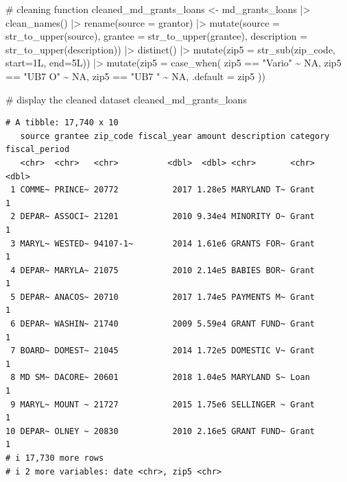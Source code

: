 \documentclass[
  letterpaper,
  DIV=11,
  numbers=noendperiod]{scrreprt}
\newenvironment{Shaded}{\begin{snugshade}}{\end{snugshade}}
\newcommand{\AttributeTok}[1]{\textcolor[rgb]{0.40,0.45,0.13}{#1}}
\newcommand{\CommentTok}[1]{\textcolor[rgb]{0.37,0.37,0.37}{#1}}
\newcommand{\ConstantTok}[1]{\textcolor[rgb]{0.56,0.35,0.01}{#1}}
\newcommand{\FunctionTok}[1]{\textcolor[rgb]{0.28,0.35,0.67}{#1}}
\newcommand{\NormalTok}[1]{\textcolor[rgb]{0.00,0.23,0.31}{#1}}
\newcommand{\OtherTok}[1]{\textcolor[rgb]{0.00,0.23,0.31}{#1}}
\newcommand{\SpecialCharTok}[1]{\textcolor[rgb]{0.37,0.37,0.37}{#1}}
\newcommand{\StringTok}[1]{\textcolor[rgb]{0.13,0.47,0.30}{#1}}
\begin{document}
\begin{Shaded}
\begin{Highlighting}[]
\CommentTok{\# cleaning function}
\NormalTok{cleaned\_md\_grants\_loans }\OtherTok{\textless{}{-}}\NormalTok{ md\_grants\_loans }\SpecialCharTok{|\textgreater{}}
  \FunctionTok{clean\_names}\NormalTok{() }\SpecialCharTok{|\textgreater{}} 
  \FunctionTok{rename}\NormalTok{(}\AttributeTok{source =}\NormalTok{ grantor) }\SpecialCharTok{|\textgreater{}} 
  \FunctionTok{mutate}\NormalTok{(}\AttributeTok{source =} \FunctionTok{str\_to\_upper}\NormalTok{(source), }\AttributeTok{grantee =} \FunctionTok{str\_to\_upper}\NormalTok{(grantee), }\AttributeTok{description =} \FunctionTok{str\_to\_upper}\NormalTok{(description)) }\SpecialCharTok{|\textgreater{}} 
  \FunctionTok{distinct}\NormalTok{() }\SpecialCharTok{|\textgreater{}}
  \FunctionTok{mutate}\NormalTok{(}\AttributeTok{zip5 =} \FunctionTok{str\_sub}\NormalTok{(zip\_code, }\AttributeTok{start=}\NormalTok{1L, }\AttributeTok{end=}\NormalTok{5L)) }\SpecialCharTok{|\textgreater{}}
  \FunctionTok{mutate}\NormalTok{(}\AttributeTok{zip5 =} \FunctionTok{case\_when}\NormalTok{(}
\NormalTok{    zip5 }\SpecialCharTok{==} \StringTok{"Vario"} \SpecialCharTok{\textasciitilde{}} \ConstantTok{NA}\NormalTok{,}
\NormalTok{    zip5 }\SpecialCharTok{==} \StringTok{"UB7 O"} \SpecialCharTok{\textasciitilde{}} \ConstantTok{NA}\NormalTok{,}
\NormalTok{    zip5 }\SpecialCharTok{==} \StringTok{"UB7 "} \SpecialCharTok{\textasciitilde{}} \ConstantTok{NA}\NormalTok{,}
    \AttributeTok{.default =}\NormalTok{ zip5}
\NormalTok{  ))}

\CommentTok{\# display the cleaned dataset}
\NormalTok{cleaned\_md\_grants\_loans}
\end{Highlighting}
\end{Shaded}

\begin{verbatim}
# A tibble: 17,740 x 10
   source grantee zip_code fiscal_year amount description category fiscal_period
   <chr>  <chr>   <chr>          <dbl>  <dbl> <chr>       <chr>            <dbl>
 1 COMME~ PRINCE~ 20772           2017 1.28e5 MARYLAND T~ Grant                1
 2 DEPAR~ ASSOCI~ 21201           2010 9.34e4 MINORITY O~ Grant                1
 3 MARYL~ WESTED~ 94107-1~        2014 1.61e6 GRANTS FOR~ Grant                1
 4 DEPAR~ MARYLA~ 21075           2010 2.14e5 BABIES BOR~ Grant                1
 5 DEPAR~ ANACOS~ 20710           2017 1.74e5 PAYMENTS M~ Grant                1
 6 DEPAR~ WASHIN~ 21740           2009 5.59e4 GRANT FUND~ Grant                1
 7 BOARD~ DOMEST~ 21045           2014 1.72e5 DOMESTIC V~ Grant                1
 8 MD SM~ DACORE~ 20601           2018 1.04e5 MARYLAND S~ Loan                 1
 9 MARYL~ MOUNT ~ 21727           2015 1.75e6 SELLINGER ~ Grant                1
10 DEPAR~ OLNEY ~ 20830           2010 2.16e5 GRANT FUND~ Grant                1
# i 17,730 more rows
# i 2 more variables: date <chr>, zip5 <chr>
\end{verbatim}
\end{document}
